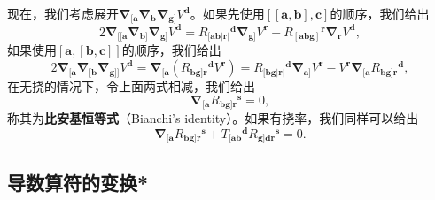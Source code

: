 现在，我们考虑展开$\boldsymbol{\nabla }_{[\boldsymbol{a}}\boldsymbol{\nabla }_{\boldsymbol{b}}\boldsymbol{\nabla }_{\boldsymbol{g}]} V^{\boldsymbol{d}}$。如果先使用$[[\boldsymbol{a} ,\boldsymbol{b}] ,\boldsymbol{c}]$的顺序，我们给出
\begin{equation*}
	2\boldsymbol{\nabla }_{[[\boldsymbol{a}}\boldsymbol{\nabla }_{\boldsymbol{b}]}\boldsymbol{\nabla }_{\boldsymbol{g}]} V^{\boldsymbol{d}} =R{_{[\boldsymbol{ab} |\boldsymbol{r} |}}^{\boldsymbol{d}}\boldsymbol{\nabla }_{\boldsymbol{g}]} V^{\boldsymbol{r}} -R{_{[\boldsymbol{abg}]}}^{\boldsymbol{r}}\boldsymbol{\nabla }_{\boldsymbol{r}} V^{\boldsymbol{d}} ,
\end{equation*}
如果使用$[\boldsymbol{a} ,[\boldsymbol{b} ,\boldsymbol{c}]]$的顺序，我们给出
\begin{equation*}
	2\boldsymbol{\nabla }_{[\boldsymbol{a}}\boldsymbol{\nabla }_{[\boldsymbol{b}}\boldsymbol{\nabla }_{\boldsymbol{g}]]} V^{\boldsymbol{d}} =\boldsymbol{\nabla }_{[\boldsymbol{a}} (R{_{\boldsymbol{bg}]\boldsymbol{r}}}^{\boldsymbol{d}} V^{\boldsymbol{r}} )=R{_{[\boldsymbol{bg} |\boldsymbol{r} |}}^{\boldsymbol{d}}\boldsymbol{\nabla }_{\boldsymbol{a}]} V^{\boldsymbol{r}} -V^{\boldsymbol{r}}\boldsymbol{\nabla }_{[\boldsymbol{a}} R{_{\boldsymbol{bg}]\boldsymbol{r}}}^{\boldsymbol{d}} ,
\end{equation*}
在无挠的情况下，令上面两式相减，我们给出
\begin{equation}
	\boldsymbol{\nabla }_{[\boldsymbol{a}} R{_{\boldsymbol{bg}]\boldsymbol{r}}}^{\boldsymbol{s}} =0,
	\label{eq:5.9}
\end{equation}
称其为\textbf{比安基恒等式}（Bianchi's identity）。如果有挠率，我们同样可以给出
\begin{equation}
	\boldsymbol{\nabla }_{[\boldsymbol{a}} R{_{\boldsymbol{bg}]\boldsymbol{r}}}^{\boldsymbol{s}} +T{_{[\boldsymbol{ab}}}^{\boldsymbol{d}} R{_{\boldsymbol{g}]\boldsymbol{dr}}}^{\boldsymbol{s}} =0.
	\label{eq:5.10}
\end{equation}

\subsection{导数算符的变换*}

